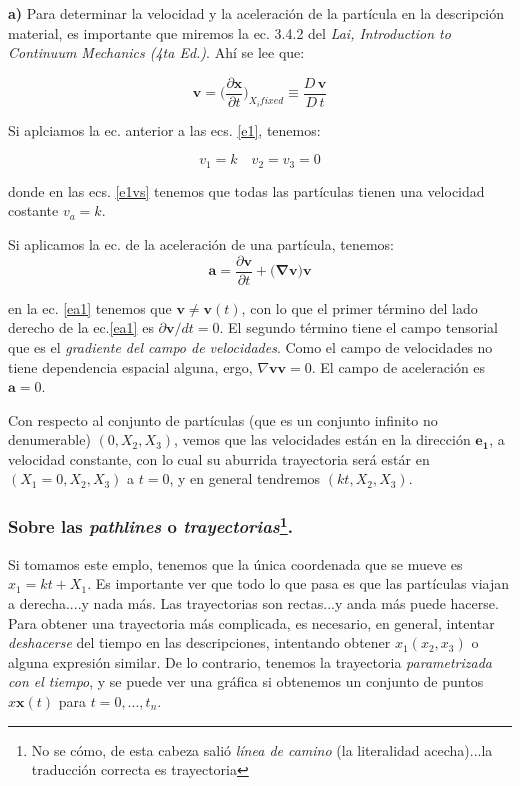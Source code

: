 \documentclass[10pt,a4paper]{article}
\begin{document}
\textbf{a)}
 Para determinar la velocidad y la aceleración de la partícula en la descripción material, es importante que miremos la ec. 3.4.2 del \textit{Lai, Introduction to Continuum Mechanics (4ta Ed.)}. Ahí se lee que:

\begin{equation} \label{evel}
\mathbf{v} = \Big( \frac{\partial \mathbf{x}}{\partial t} \Big)_{X_i fixed} \equiv \frac{D \, \mathbf{v}}{D \, t}
\end{equation}

Si aplciamos la ec. anterior a las ecs. \eqref{e1}, tenemos:

\begin{equation}\label{e1vs}
v_1 = k \quad v_2 = v_3 = 0
\end{equation}

\noindent donde en las ecs. \eqref{e1vs} tenemos que todas las partículas tienen una velocidad costante $v_a = k$.

Si aplicamos la ec. de la aceleración de una partícula, tenemos:
\begin{equation}\label{ea1}
\mathbf{a} = \frac{\partial \mathbf{v}}{\partial t} + \Big(  \mathbf{\nabla v} \Big) \mathbf{v}
\end{equation}

\noindent en la ec. \eqref{ea1} tenemos que $\mathbf{v} \neq \mathbf{v}(t)$, con lo que el primer término del lado derecho de la ec.\eqref{ea1} es $\partial \mathbf{v} / dt = 0$. El segundo término tiene el campo tensorial que es el \textit{gradiente del campo de velocidades}. Como el campo de velocidades no tiene dependencia espacial alguna, ergo, $\nabla \mathbf{v}\mathbf{v} = 0$. El campo de aceleración es $\mathbf{a} = 0$.

Con respecto al conjunto de partículas (que es un conjunto infinito no denumerable)  $(0,X_2,X_3)$, vemos que las velocidades están en la dirección $\mathbf{e_1}$, a velocidad constante, con lo cual su aburrida trayectoria será estár en $(X_1 = 0,X_2,X_3)$ a $t = 0$, y en general tendremos $(kt, X_2,X_3)$.


\subsubsection*{Sobre las \textit{pathlines} o \textit{trayectorias}\footnote{No se cómo, de esta cabeza salió \textit{línea de camino} (la literalidad acecha)...la traducción correcta es trayectoria}.}

Si tomamos este emplo, tenemos que la única coordenada que se mueve es $x_1 = kt + X_1$. Es importante ver que todo lo que pasa es que las partículas viajan a derecha....y nada más. Las trayectorias son rectas...y anda más puede hacerse. Para obtener una trayectoria más complicada, es necesario, en general, intentar \textit{deshacerse} del tiempo en las descripciones, intentando obtener $x_1(x_2,x_3)$ o alguna expresión similar. De lo contrario, tenemos la trayectoria \textit{parametrizada con el tiempo}, y se puede ver una gráfica si obtenemos un conjunto de puntos $x\mathbf{x}(t)$ para $t = 0,...,t_n$.
\end{document}
